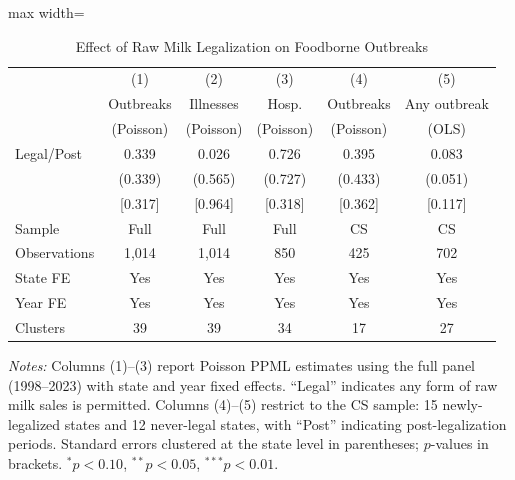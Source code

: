 \begin{table}[t]
\centering
\caption{Effect of Raw Milk Legalization on Foodborne Outbreaks}
\label{tab:main}
\begin{adjustbox}{max width=\textwidth}
\begin{tabular}{lccccc}
\hline\hline
 & (1) & (2) & (3) & (4) & (5) \\
 & Outbreaks & Illnesses & Hosp. & Outbreaks & Any outbreak \\
 & (Poisson) & (Poisson) & (Poisson) & (Poisson) & (OLS) \\
\hline
Legal/Post & 0.339 & 0.026 & 0.726 & 0.395 & 0.083 \\
 & (0.339) & (0.565) & (0.727) & (0.433) & (0.051) \\
 & [0.317] & [0.964] & [0.318] & [0.362] & [0.117] \\
\hline
Sample & Full & Full & Full & CS & CS \\
Observations & 1,014 & 1,014 & 850 & 425 & 702 \\
State FE & Yes & Yes & Yes & Yes & Yes \\
Year FE & Yes & Yes & Yes & Yes & Yes \\
Clusters & 39 & 39 & 34 & 17 & 27 \\
\hline\hline
\end{tabular}
\end{adjustbox}
\begin{tablenotes}[flushleft]
\small
\item \textit{Notes:} Columns (1)--(3) report Poisson PPML estimates using the full panel (1998--2023) with state and year fixed effects. ``Legal'' indicates any form of raw milk sales is permitted. Columns (4)--(5) restrict to the CS sample: 15 newly-legalized states and 12 never-legal states, with ``Post'' indicating post-legalization periods. Standard errors clustered at the state level in parentheses; $p$-values in brackets. $^{*}p<0.10$, $^{**}p<0.05$, $^{***}p<0.01$.
\end{tablenotes}
\end{table}
